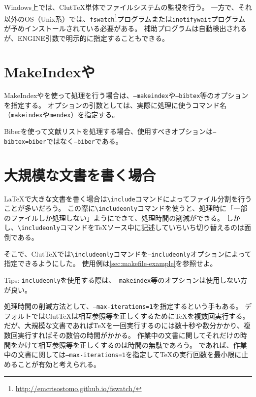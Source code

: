 \documentclass[a4paper]{ltjsreport}
\newcommand\ClutTeX{Clut\TeX}
\newcommand\texcmd[1]{\texttt{\textbackslash #1}}
\newcommand\metavar[1]{\textsf{#1}}
\begin{document}
Windows上では、\ClutTeX{}単体でファイルシステムの監視を行う。
一方で、それ以外のOS（Unix系）では、\texttt{fswatch}\footnote{\url{http://emcrisostomo.github.io/fswatch/}}プログラムまたは\texttt{inotifywait}プログラムが予めインストールされている必要がある。
補助プログラムは自動検出されるが、\metavar{ENGINE}引数で明示的に指定することもできる。

\section{MakeIndexや\BibTeX}
MakeIndexや\BibTeX を使って処理を行う場合は、\texttt{--makeindex}や\texttt{--bibtex}等のオプションを指定する。
オプションの引数としては、実際に処理に使うコマンド名（\texttt{makeindex}や\texttt{mendex}）を指定する。

Biberを使って文献リストを処理する場合、使用すべきオプションは\texttt{--bibtex=biber}ではなく\texttt{--biber}である。


\section{大規模な文書を書く場合}
\LaTeX{}で大きな文書を書く場合は\texcmd{include}コマンドによってファイル分割を行うことが多いだろう。
この際に\texcmd{includeonly}コマンドを使うと、処理時に「一部のファイルしか処理しない」ようにできて、処理時間の削減ができる。
しかし、\texcmd{includeonly}コマンドを\TeX{}ソース中に記述していちいち切り替えるのは面倒である。

そこで、\ClutTeX{}では\texcmd{includeonly}コマンドを\texttt{--includeonly}オプションによって指定できるようにした。
使用例は\cref{sec:makefile-example}を参照せよ。

Tips: \texttt{includeonly}を使用する際は、\texttt{--makeindex}等のオプションは使用しない方が良い。

処理時間の削減方法として、\texttt{--max-iterations=1}を指定するという手もある。
デフォルトでは\ClutTeX{}は相互参照等を正しくするために\TeX{}を複数回実行する。
だが、大規模な文書であれば\TeX{}を一回実行するのには数十秒や数分かかり、複数回実行すればその数倍の時間がかかる。
作業中の文書に関してそれだけの時間をかけて相互参照等を正しくするのは時間の無駄であろう。
であれば、作業中の文書に関しては\texttt{--max-iterations=1}を指定して\TeX{}の実行回数を最小限に止めることが有効と考えられる。
\end{document}
